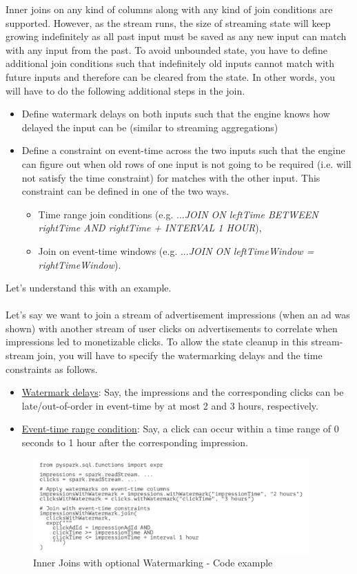 \documentclass[10pt,a4paper]{article}
\newcommand{\nline}{\\~\\}
\begin{document}
 Inner joins on any kind of columns along with any kind of join conditions are supported. However, as the stream runs, the size of streaming state will keep growing indefinitely as all past input must be saved as any new input can match with any input from the past. To avoid unbounded state, you have to define additional join conditions such that indefinitely old inputs cannot match with future inputs and therefore can be cleared from the state. In other words, you will have to do the following additional steps in the join.
 \begin{itemize}
 	\item Define watermark delays on both inputs such that the engine knows how delayed the input can be (similar to streaming aggregations)
 	\item Define a constraint on event-time across the two inputs such that the engine can figure out when old rows of one input is not going to be required (i.e. will not satisfy the time constraint) for matches with the other input. This constraint can be defined in one of the two ways.
 	\begin{itemize}
 		\item Time range join conditions (e.g. ...\textit{JOIN ON leftTime BETWEEN rightTime AND rightTime + INTERVAL 1 HOUR}),
 		\item Join on event-time windows (e.g. ...\textit{JOIN ON leftTimeWindow = rightTimeWindow}).
 	\end{itemize}
 \end{itemize}
Let’s understand this with an example.
\nline
Let’s say we want to join a stream of advertisement impressions (when an ad was shown) with another stream of user clicks on advertisements to correlate when impressions led to monetizable clicks. To allow the state cleanup in this stream-stream join, you will have to specify the watermarking delays and the time constraints as follows.
\begin{itemize}
	\item \uline{Watermark delays}: Say, the impressions and the corresponding clicks can be late/out-of-order in event-time by at most 2 and 3 hours, respectively.
	\item \uline{Event-time range condition}: Say, a click can occur within a time range of 0 seconds to 1 hour after the corresponding impression.
\end{itemize}
\pagebreak
     \begin{figure}[ht!]
 \hfill \includegraphics[width=300pt]{images/spark-streaming-stream-joins}
 \hspace*{\fill}
 \caption{Inner Joins with optional Watermarking - Code example}
 \end{figure} 
\end{document}

